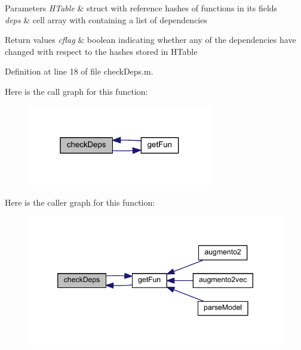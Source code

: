 \begin{DoxyParams}{Parameters}
{\em H\+Table} & struct with reference hashes of functions in its fields\\
\hline
{\em deps} & cell array with containing a list of dependencies\\
\hline
\end{DoxyParams}

\begin{DoxyRetVals}{Return values}
{\em cflag} & boolean indicating whether any of the dependencies have changed with respect to the hashes stored in H\+Table \\
\hline
\end{DoxyRetVals}


Definition at line 18 of file check\+Deps.\+m.



Here is the call graph for this function\+:\nopagebreak
\begin{figure}[H]
\begin{center}
\leavevmode
\includegraphics[width=229pt]{classamimodel_ab566026e57f6cbce21a2a2c72b9f7f2b_cgraph}
\end{center}
\end{figure}




Here is the caller graph for this function\+:\nopagebreak
\begin{figure}[H]
\begin{center}
\leavevmode
\includegraphics[width=346pt]{classamimodel_ab566026e57f6cbce21a2a2c72b9f7f2b_icgraph}
\end{center}
\end{figure}


